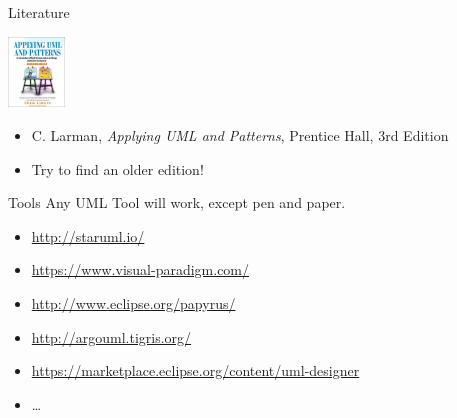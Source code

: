\documentclass[10pt,t,a4paper]{beamer}
\begin{document}
\begin{frame}[shrink=15,label=sec-5]{Literature}

\includegraphics[width=1.5cm]{./FLarman.jpg}
\begin{itemize}
\item C. Larman, \emph{Applying UML and Patterns}, Prentice Hall, 3rd Edition
\item Try to find an older edition!
\end{itemize}

\end{frame}
\begin{frame}[label=sec-6]{Tools}
Any UML Tool will work, except pen and paper.

\begin{itemize}
\item \url{http://staruml.io/}
\item \url{https://www.visual-paradigm.com/}
\item \url{http://www.eclipse.org/papyrus/}
\item \url{http://argouml.tigris.org/}
\item \url{https://marketplace.eclipse.org/content/uml-designer}
\item \ldots{}
\end{itemize}
\end{frame}
\end{document}
